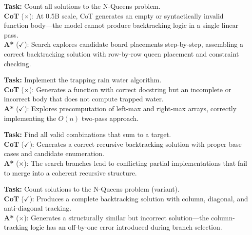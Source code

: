 \documentclass[11pt]{article}
\begin{document}
{{\begin{examplebox}[title=CC/4 --- A* Correct{,} CoT Wrong (0.5B)]
\textbf{Task:} Count all solutions to the N-Queens problem.\\[4pt]
\textbf{CoT} ($\times$): At 0.5B scale, CoT generates an empty or syntactically invalid function body---the model cannot produce backtracking logic in a single linear pass.\\[4pt]
\textbf{A*} ($\checkmark$): Search explores candidate board placements step-by-step, assembling a correct backtracking solution with row-by-row queen placement and constraint checking.
\end{examplebox}

\begin{examplebox}[title=CC/6 --- A* Correct{,} CoT Wrong (0.5B)]
\textbf{Task:} Implement the trapping rain water algorithm.\\[4pt]
\textbf{CoT} ($\times$): Generates a function with correct docstring but an incomplete or incorrect body that does not compute trapped water.\\[4pt]
\textbf{A*} ($\checkmark$): Explores precomputation of left-max and right-max arrays, correctly implementing the $O(n)$ two-pass approach.
\end{examplebox}

\begin{examplebox}[title=CC/7 --- CoT Correct{,} A* Wrong (0.5B)]
\textbf{Task:} Find all valid combinations that sum to a target.\\[4pt]
\textbf{CoT} ($\checkmark$): Generates a correct recursive backtracking solution with proper base cases and candidate enumeration.\\[4pt]
\textbf{A*} ($\times$): The search branches lead to conflicting partial implementations that fail to merge into a coherent recursive structure.
\end{examplebox}

\begin{examplebox}[title=CC/14 --- CoT Correct{,} A* Wrong (0.5B)]
\textbf{Task:} Count solutions to the N-Queens problem (variant).\\[4pt]
\textbf{CoT} ($\checkmark$): Produces a complete backtracking solution with column, diagonal, and anti-diagonal tracking.\\[4pt]
\textbf{A*} ($\times$): Generates a structurally similar but incorrect solution---the column-tracking logic has an off-by-one error introduced during branch selection.
\end{examplebox}

}}
\end{document}
